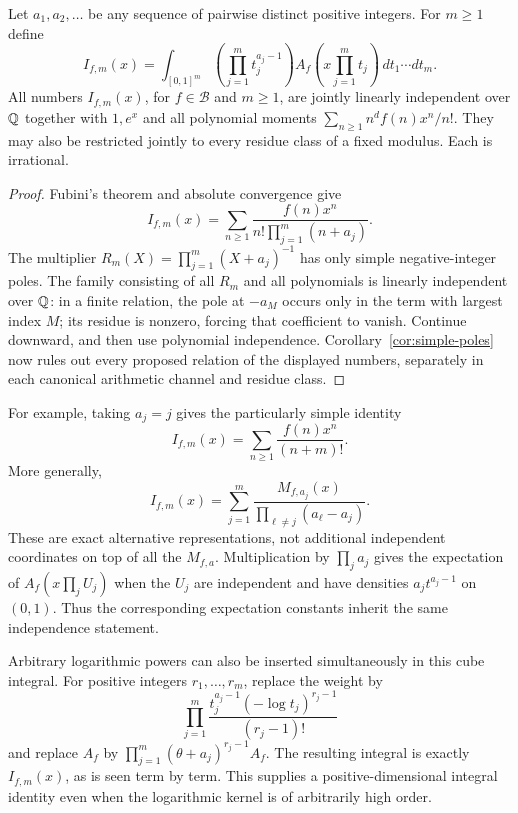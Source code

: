 \begin{theorem}
\label{thm:v5-product-kernels}
Let $a_1,a_2,\ldots$ be any sequence of pairwise distinct positive integers.
For $m\geq1$ define
\[
 I_{f,m}(x)=\int_{[0,1]^m}
       \left(\prod_{j=1}^m t_j^{a_j-1}\right)
       A_f\!\left(x\prod_{j=1}^m t_j\right)
       \,dt_1\cdots dt_m.
\]
All numbers $I_{f,m}(x)$, for $f\in\mathcal B$ and $m\geq1$, are
jointly linearly independent over $\mathbb Q$ together with $1,e^x$ and
all polynomial moments $\sum_{n\geq1}n^d f(n)x^n/n!$.
They may also be restricted jointly to every residue class of a fixed
modulus.  Each is irrational.
\end{theorem}
\begin{proof}
Fubini's theorem and absolute convergence give
\[
 I_{f,m}(x)=\sum_{n\geq1}
   \frac{f(n)x^n}{n!\prod_{j=1}^m(n+a_j)}.
\]
The multiplier $R_m(X)=\prod_{j=1}^m(X+a_j)^{-1}$ has only simple
negative-integer poles.  The family consisting of all $R_m$ and all
polynomials is linearly independent over $\mathbb Q$: in a finite relation,
the pole at $-a_M$ occurs only in the term with largest index $M$;
its residue is nonzero, forcing that coefficient to vanish.  Continue
downward, and then use polynomial independence.
Corollary~\ref{cor:simple-poles} now rules out every proposed relation
of the displayed numbers, separately in each canonical arithmetic
channel and residue class.
\end{proof}

For example, taking $a_j=j$ gives the particularly simple identity
\[
 I_{f,m}(x)=\sum_{n\geq1}\frac{f(n)x^n}{(n+m)!}.
\]
More generally,
\[
 I_{f,m}(x)=\sum_{j=1}^m
 \frac{M_{f,a_j}(x)}{\prod_{\ell\ne j}(a_\ell-a_j)}.
\]
These are exact alternative representations, not additional independent
coordinates on top of all the $M_{f,a}$.  Multiplication by
$\prod_j a_j$ gives the expectation of $A_f(x\prod_j U_j)$ when
the $U_j$ are independent and have densities $a_j t^{a_j-1}$ on
$(0,1)$.  Thus the corresponding expectation constants inherit the
same independence statement.

Arbitrary logarithmic powers can also be inserted simultaneously in
this cube integral.  For positive integers $r_1,\ldots,r_m$, replace
the weight by
\[
 \prod_{j=1}^m
 \frac{t_j^{a_j-1}(-\log t_j)^{r_j-1}}{(r_j-1)!}
\]
and replace $A_f$ by
$\prod_{j=1}^m(\theta+a_j)^{r_j-1}A_f$.
The resulting integral is exactly $I_{f,m}(x)$, as is seen term by
term.  This supplies a positive-dimensional integral identity even
when the logarithmic kernel is of arbitrarily high order.

